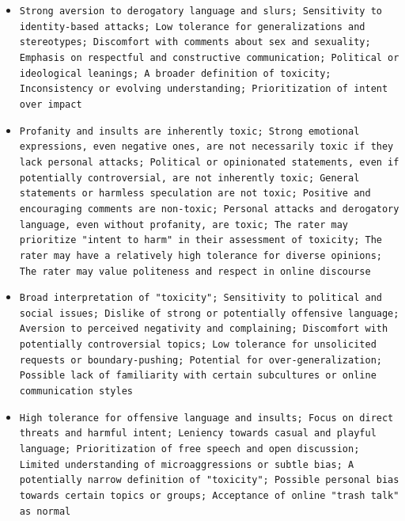 \documentclass[11pt]{article}
\begin{document}
\begin{itemize}
\item \texttt{Strong aversion to derogatory language and slurs; Sensitivity to identity-based attacks; Low tolerance for generalizations and stereotypes; Discomfort with comments about sex and sexuality; Emphasis on respectful and constructive communication; Political or ideological leanings; A broader definition of toxicity; Inconsistency or evolving understanding; Prioritization of intent over impact}
\item \texttt{Profanity and insults are inherently toxic; Strong emotional expressions, even negative ones, are not necessarily toxic if they lack personal attacks; Political or opinionated statements, even if potentially controversial, are not inherently toxic; General statements or harmless speculation are not toxic; Positive and encouraging comments are non-toxic; Personal attacks and derogatory language, even without profanity, are toxic; The rater may prioritize "intent to harm" in their assessment of toxicity; The rater may have a relatively high tolerance for diverse opinions; The rater may value politeness and respect in online discourse}
\item \texttt{Broad interpretation of "toxicity"; Sensitivity to political and social issues; Dislike of strong or potentially offensive language; Aversion to perceived negativity and complaining; Discomfort with potentially controversial topics; Low tolerance for unsolicited requests or boundary-pushing; Potential for over-generalization; Possible lack of familiarity with certain subcultures or online communication styles}
\item \texttt{High tolerance for offensive language and insults; Focus on direct threats and harmful intent; Leniency towards casual and playful language; Prioritization of free speech and open discussion; Limited understanding of microaggressions or subtle bias; A potentially narrow definition of "toxicity"; Possible personal bias towards certain topics or groups; Acceptance of online "trash talk" as normal}
\end{itemize}
\end{document}
